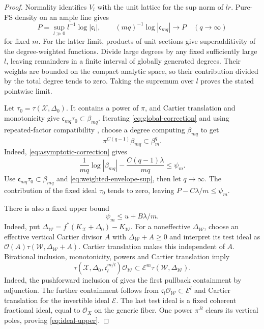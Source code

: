 \documentclass[11pt,reqno]{amsart}
\theoremstyle{definition}
\theoremstyle{remark}
\numberwithin{equation}{section}
\begin{document}
\begin{proof}
Normality identifies $V_l$ with the unit lattice for the sup norm of
$lr$. Pure-FS density on an ample line
\cite[Corollary~7.6 and Theorem~7.8]{BE} gives
\begin{equation}\label{eq:weighted-envelope-sup}
 P=\sup_{l\gg0}l^{-1}\log|\mathfrak c_l|,
 \qquad (mq)^{-1}\log|\mathfrak c_{mq}|\longrightarrow P
 \quad(q\longrightarrow\infty)
\end{equation}
for fixed $m$. For the latter limit, products of unit sections give
superadditivity of the degree-weighted functions. Divide large
degrees by any fixed sufficiently large $l$, leaving remainders in
a finite interval of globally generated degrees. Their weights are
bounded on the compact analytic space, so their contribution divided
by the total degree tends to zero. Taking the supremum over $l$
proves the stated pointwise limit.

Let $\tau_0=\tau(\mathcal X,\Delta_0)$. It contains a power of $\pi$,
and Cartier translation and monotonicity give
$\mathfrak c_{mq}\tau_0\subset\beta_{mq}$. Iterating
\eqref{eq:global-correction} and using repeated-factor compatibility
\cite[Theorem~8.41(c)]{BMP}, choose a degree computing $\beta_{mq}$ to get
\begin{equation}\label{eq:asymptotic-correction}
 \pi^{C(q-1)}\beta_{mq}\subset\beta_m^q.
\end{equation}
Indeed, \eqref{eq:asymptotic-correction} gives
\[
 \frac{1}{mq}\log|\beta_{mq}|
       -\frac{C(q-1)\lambda}{mq}\leq\psi_m.
\]
Use $\mathfrak c_{mq}\tau_0\subset\beta_{mq}$ and
\eqref{eq:weighted-envelope-sup}, then let $q\to\infty$.
The contribution of the fixed ideal $\tau_0$ tends to zero, leaving
$P-C\lambda/m\leq\psi_m$.

There is also a fixed upper bound
\begin{equation}\label{eq:ideal-upper}
 \psi_m\leq u+B\lambda/m.
\end{equation}
Indeed, put
$\Delta_{\mathcal W}=f^*(K_{\mathcal X}+\Delta_0)-K_{\mathcal W}$.
For a noneffective $\Delta_{\mathcal W}$, choose an effective
vertical Cartier divisor $A$ with $\Delta_{\mathcal W}+A\geq0$ and
interpret its test ideal as
$\mathcal O(A)\tau(\mathcal W,\Delta_{\mathcal W}+A)$.
Cartier translation makes this independent of $A$.
Birational inclusion, monotonicity, powers and Cartier translation
\cite[Proposition~7.16(b), Theorem~8.41(b),(c),(j)]{BMP} imply
\[
 \tau(\mathcal X,\Delta_0,\mathfrak c_l^{m/l})\mathcal O_{\mathcal W}
 \subset\mathcal E^m\tau(\mathcal W,\Delta_{\mathcal W}).
\]
Indeed, the pushforward inclusion of
\cite[Theorem~8.41(j)]{BMP} gives the first pullback containment
by adjunction. The further containment follows from
$\mathfrak c_l\mathcal O_{\mathcal W}\subset\mathcal E^l$ and
Cartier translation for the invertible ideal $\mathcal E$.
The last test ideal is a fixed coherent fractional ideal, equal to
$\mathcal O_X$ on the generic fiber. One power $\pi^B$ clears its
vertical poles, proving \eqref{eq:ideal-upper}.


\end{proof}
\end{document}
